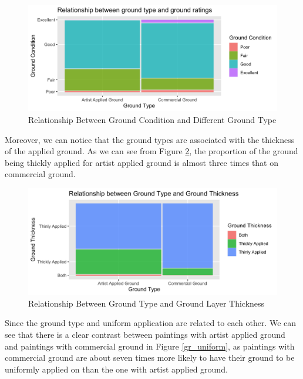 \documentclass[11pt, oneside]{article}
\begin{document}
\begin{figure}[H]
    \centering
    \includegraphics[scale=0.17]{images/gr_type.png}
    \caption{Relationship Between Ground Condition and Different Ground Type}
    \label{gr_type}
\end{figure}

\noindent Moreover, we can notice that the ground types are associated with the thickness of the applied ground. As we can see from Figure \ref{gr_thickness}, the proportion of the ground being thickly applied for artist applied ground is almost three times that on commercial ground.

\begin{figure}[H]
    \centering
    \includegraphics[scale=0.17]{images/type_thickness.png}
    \caption{Relationship Between Ground Type and Ground Layer Thickness}
    \label{gr_thickness}
\end{figure}

\noindent Since the ground type and uniform application are related to each other. We can see that there is a clear contrast between paintings with artist applied ground and paintings with commercial ground in Figure \ref{gr_uniform}, as paintings with commercial ground are about seven times more likely to have their ground to be uniformly applied on than the one with artist applied ground.
\end{document}
